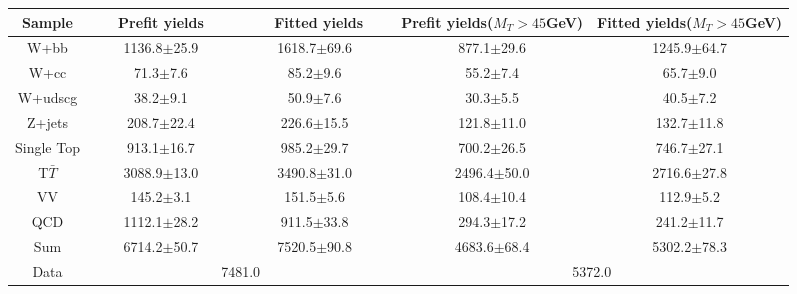  \begin{adjustbox}{width=\textwidth,center=\textwidth}
   \begin{tabular} {c|cc|cc} \hline\hline
			 Sample & ~~~Prefit yields~~~ & ~~~~Fitted yields~~~ & Prefit yields($M_T>45$GeV) & Fitted yields($M_T>45$GeV) \\ 
 \hline
W+bb&1136.8$\pm$25.9&1618.7$\pm$69.6&877.1$\pm$29.6&1245.9$\pm$64.7\\
W+cc&71.3$\pm$7.6&85.2$\pm$9.6&55.2$\pm$7.4&65.7$\pm$9.0\\
W+udscg&38.2$\pm$9.1&50.9$\pm$7.6&30.3$\pm$5.5&40.5$\pm$7.2\\
Z+jets&208.7$\pm$22.4&226.6$\pm$15.5&121.8$\pm$11.0&132.7$\pm$11.8\\
Single Top&913.1$\pm$16.7&985.2$\pm$29.7&700.2$\pm$26.5&746.7$\pm$27.1\\
T$\bar{T}$&3088.9$\pm$13.0&3490.8$\pm$31.0&2496.4$\pm$50.0&2716.6$\pm$27.8\\
VV&145.2$\pm$3.1&151.5$\pm$5.6&108.4$\pm$10.4&112.9$\pm$5.2\\
QCD&1112.1$\pm$28.2&911.5$\pm$33.8&294.3$\pm$17.2&241.2$\pm$11.7\\
\hline
Sum &6714.2$\pm$50.7&7520.5$\pm$90.8&4683.6$\pm$68.4&5302.2$\pm$78.3\\
\hline
Data & \multicolumn{2}{c|}{7481.0} & \multicolumn{2}{c}{5372.0}\\
   \hline\hline
   \end{tabular}
 \end{adjustbox}

